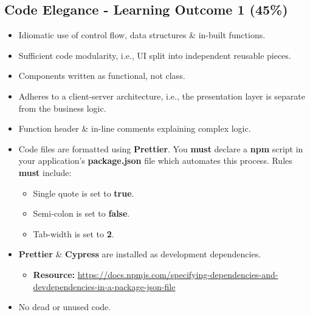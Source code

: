 \documentclass{article}
\begin{document}
\subsection*{Code Elegance - Learning Outcome 1 (45\%)}
\begin{itemize}
    \item Idiomatic use of control flow, data structures \& in-built functions.
    \item Sufficient code modularity, i.e., UI split into independent reusable pieces.
    \item Components written as functional, not class.
    \item Adheres to a client-server architecture, i.e., the presentation layer is separate from the business logic.
    \item Function header \& in-line comments explaining complex logic.
    \item Code files are formatted using \textbf{Prettier}. You \textbf{must} declare a \textbf{npm} script in your application's \textbf{package.json} file which automates this process. Rules \textbf{must} include:
    \begin{itemize}
        \item Single quote is set to \textbf{true}.
        \item Semi-colon is set to \textbf{false}.
        \item Tab-width is set to \textbf{2}.
    \end{itemize}
    \item \textbf{Prettier} \& \textbf{Cypress} are installed as development dependencies.
    \begin{itemize}
        \item \textbf{Resource:} \small\href{https://docs.npmjs.com/specifying-dependencies-and-devdependencies-in-a-package-json-file}{https://docs.npmjs.com/specifying-dependencies-and-devdependencies-in-a-package-json-file}
    \end{itemize}
    \item No dead or unused code.
\end{itemize}
\end{document}
